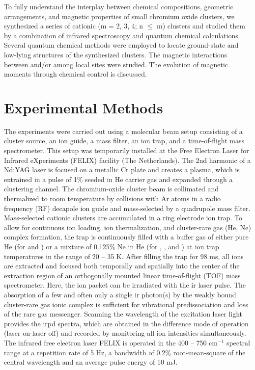 \begin{refsection}
To fully understand the interplay between chemical compositions, geometric arrangements, and magnetic properties of small chromium oxide clusters, we synthesized a series of cationic  (m =  2, 3, 4; n $\leq$ m) clusters and studied them by a combination of infrared spectroscopy and quantum chemical calculations. Several quantum chemical methods were employed to locate ground-state and low-lying structures of the synthesized clusters. The magnetic interactions between and/or among local sites were studied. The evolution of magnetic moments through chemical control is discussed. 

\section{Experimental Methods}

The experiments were carried out using a molecular beam setup consisting of a cluster source, an ion guide, a mass filter, an ion trap, and a time-of-flight mass spectrometer. \cite{Daniel2009} This setup was temporarily installed at the Free Electron Laser for Infrared eXperiments (FELIX) facility (The Netherlands).\cite{Oepts1995} The 2nd harmonic of a Nd:YAG laser is focused on a metallic Cr plate and creates a plasma, which is entrained in a pulse of 1\%  seeded in He carrier gas and expanded through a clustering channel. The chromium-oxide cluster beam is collimated and thermalized to room temperature by collisions with Ar atoms in a radio frequency (RF) decapole ion guide and mass-selected by a quadrupole mass filter. Mass-selected cationic clusters are accumulated in a ring electrode ion trap. To allow for continuous ion loading, ion thermalization, and cluster-rare gas (He, Ne) complex formation, the trap is continuously filled with a buffer gas of either pure He (for  and ) or a mixture of 0.125\% Ne in He (for , , and ) at ion trap temperatures in the range of 20 -- 35 K. After filling the trap for 98 ms, all ions are extracted and focused both temporally and spatially into the center of the extraction region of an orthogonally mounted linear time-of-flight (TOF) mass spectrometer. Here, the ion packet can be irradiated with the \acrshort{ir} laser pulse. The absorption of a few and often only a single \acrshort{ir} photon(s) by the weakly bound cluster-rare gas ionic complex is sufficient for vibrational predissociation and loss of the rare gas messenger. Scanning the wavelength of the excitation laser light provides the \acrshort{irpd} spectra, which are obtained in the difference mode of operation (laser on-laser off) and recorded by monitoring all ion intensities simultaneously. The infrared free electron laser FELIX is operated in the 400 -- 750 cm$^{-1}$ spectral range at a repetition rate of 5 Hz, a bandwidth of 0.2\% root-mean-square of the central wavelength and an average pulse energy of 10 mJ.


\end{refsection}

